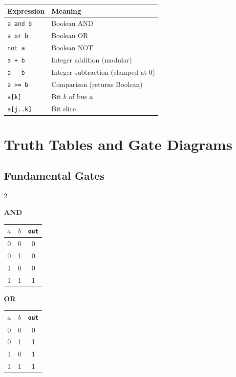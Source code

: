\documentclass[11pt,a4paper,openany]{book}
\theoremstyle{plain}
\theoremstyle{definition}
\theoremstyle{remark}
\begin{document}
\begin{center}
\begin{tabular}{ll}
  \toprule
  \textbf{Expression} & \textbf{Meaning} \\
  \midrule
  \texttt{a and b}  & Boolean AND \\
  \texttt{a or b}   & Boolean OR \\
  \texttt{not a}    & Boolean NOT \\
  \texttt{a + b}    & Integer addition (modular) \\
  \texttt{a - b}    & Integer subtraction (clamped at 0) \\
  \texttt{a >= b}   & Comparison (returns Boolean) \\
  \texttt{a[k]}     & Bit $k$ of bus $a$ \\
  \texttt{a[j..k]}  & Bit slice \\
  \bottomrule
\end{tabular}
\end{center}

\chapter{Truth Tables and Gate Diagrams}
\label{app:truthtables}

\section{Fundamental Gates}

\begin{multicols}{2}

\noindent\textbf{AND}\\[4pt]
\begin{tabular}{cc|c}
  \toprule
  $a$ & $b$ & \texttt{out} \\
  \midrule
  0 & 0 & 0 \\
  0 & 1 & 0 \\
  1 & 0 & 0 \\
  1 & 1 & 1 \\
  \bottomrule
\end{tabular}

\columnbreak

\noindent\textbf{OR}\\[4pt]
\begin{tabular}{cc|c}
  \toprule
  $a$ & $b$ & \texttt{out} \\
  \midrule
  0 & 0 & 0 \\
  0 & 1 & 1 \\
  1 & 0 & 1 \\
  1 & 1 & 1 \\
  \bottomrule
\end{tabular}

\end{multicols}
\end{document}
